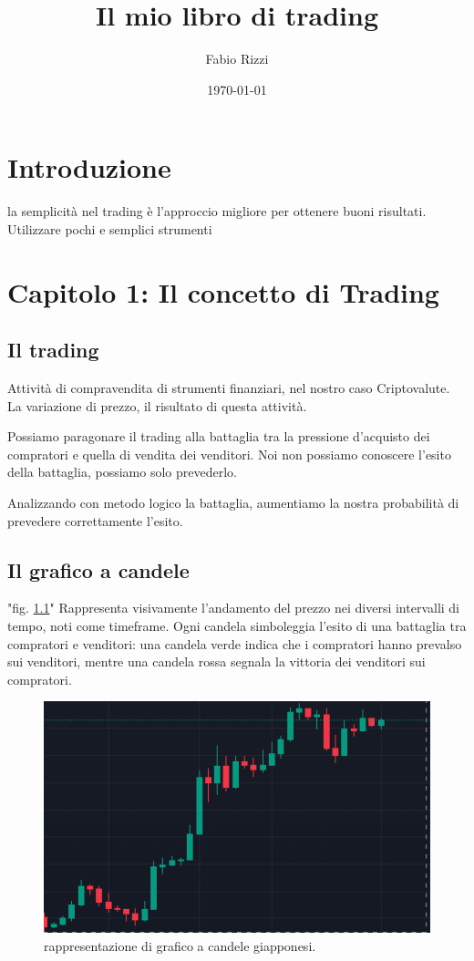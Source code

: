 \documentclass[12pt]{book}
\begin{document}
\title{Il mio libro di trading}
\author{Fabio Rizzi}
\date{\today}
\maketitle  %

\tableofcontents

\chapter*{Introduzione}
la semplicità nel trading è l'approccio migliore per ottenere buoni risultati.\\
Utilizzare pochi e semplici strumenti
\chapter{Capitolo 1: Il concetto di Trading}
\section{Il trading} 
Attività di compravendita di strumenti finanziari, nel nostro caso Criptovalute. La variazione di prezzo, il risultato di questa attività.

Possiamo paragonare il trading alla battaglia tra la pressione d'acquisto dei compratori e quella di vendita dei venditori. Noi non possiamo conoscere l'esito della battaglia, possiamo solo prevederlo.

Analizzando con metodo logico la battaglia, aumentiamo la nostra probabilità di prevedere correttamente l'esito.
\section{Il grafico a candele} "fig. \ref{graficocandele}" Rappresenta visivamente l'andamento del prezzo nei diversi intervalli di tempo, noti come timeframe. Ogni candela simboleggia l'esito di una battaglia tra compratori e venditori: una candela verde indica che i compratori hanno prevalso sui venditori, mentre una candela rossa segnala la vittoria dei venditori sui compratori.

\begin{figure}[h!]
    \centering
    \includegraphics[width=0.5\linewidth]{Immagini/grafico-candele.png} %
    \caption{rappresentazione di grafico a candele giapponesi.}
    \label{graficocandele} %
\end{figure}
\end{document}
